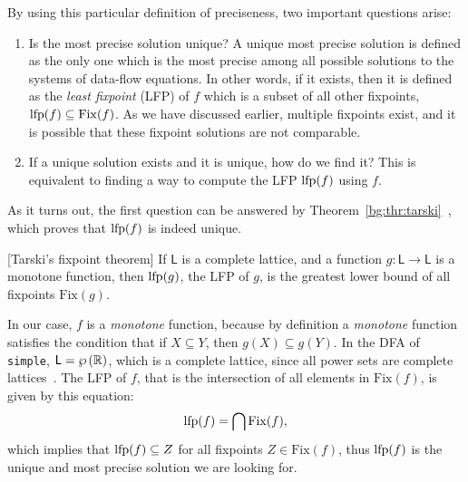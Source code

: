By using this particular definition of preciseness, two important questions
arise:
\begin{enumerate}

    \item Is the most precise solution unique?  A unique most precise solution
    is defined as the only one which is the most precise among all possible
    solutions to the systems of data-flow equations.  In other words, if
    it exists, then it is defined as the \emph{least fixpoint} (LFP) of
    $f$ which is a subset of all other fixpoints, \ie~$\operatorname{\mathrm{lfp}} (f) \subseteq
    \mathrm{Fix}(f)$.  As we have discussed earlier, multiple fixpoints exist,
    and it is possible that these fixpoint solutions are not comparable.

    \item If a unique solution exists and it is unique, how do we find it?
    This is equivalent to finding a way to compute the LFP $\operatorname{\mathrm{lfp}}(f)$ using $f$.

\end{enumerate}

As it turns out, the first question can be answered by
Theorem~\ref{bg:thr:tarski}~\cite{tarski55, nielson99}, which proves that $\operatorname{\mathrm{lfp}}
(f)$ is indeed unique.
\begin{theorem}
    \textup{[Tarski's fixpoint theorem]}
    If $\mathsf{L}$ is a complete lattice\footnotemark[2], and a function
    $g: \mathsf{L} \to \mathsf{L}$ is a monotone function, then $\operatorname{\mathrm{lfp}}(g)$,
    the LFP of $g$, is the greatest lower bound of all fixpoints
    $\mathrm{Fix}(g)$.\label{bg:thr:tarski}
\end{theorem}

In our case, $f$ is a \emph{monotone} function, because by definition a
\emph{monotone} function satisfies the condition that if $X \subseteq Y$,
then $g(X) \subseteq g(Y)$.  In the DFA of \verb|simple|, $\mathsf{L} =
\wp\left({\mathbb{R}}\right)$, which is a complete lattice, since all power sets are
complete lattices~\cite{nielson99}.  The LFP of $f$, that is the intersection
of all elements in $\mathrm{Fix}(f)$, is given by this equation:
\begin{equation}
    \operatorname{\mathrm{lfp}} (f) = \bigcap \mathrm{Fix}(f),
\end{equation}
which implies that $\operatorname{\mathrm{lfp}} (f) \subseteq Z$ for all fixpoints $Z \in
\mathrm{Fix}(f)$, thus $\operatorname{\mathrm{lfp}} (f)$ is the unique and most precise solution we
are looking for.


